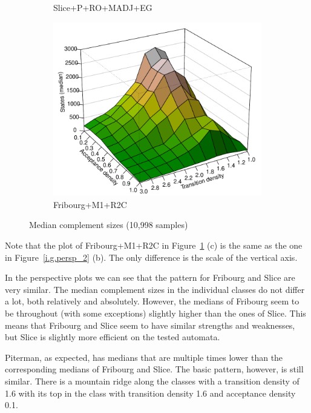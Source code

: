 \begin{figure}[ht]
\begin{subfigure}[t]{\perspwidth\textwidth}
  \caption{Slice+P+RO+MADJ+EG}
  \end{subfigure}
  \hfill
  \begin{subfigure}[t]{\perspwidth\textwidth}
  \centering
  \includegraphics[width=\textwidth]{figures/r/external/goal/s.median.Fribourg+M1+R2C.pdf}
  \caption{Fribourg+M1+R2C}
  \end{subfigure}
  \hfill
\caption{Median complement sizes (10,998 samples)}
\label{e.g.persp}
\end{figure}

Note that the plot of Fribourg+M1+R2C in Figure~\ref{e.g.persp} (c) is the same as the one in Figure~\ref{i.g.persp_2} (b). The only difference is the scale of the vertical axis.

In the perspective plots we can see that the pattern for Fribourg and Slice are very similar. The median complement sizes in the individual classes do not differ a lot, both relatively and absolutely. However, the medians of Fribourg seem to be throughout (with some exceptions) slightly higher than the ones of Slice. This means that Fribourg and Slice seem to have similar strengths and weaknesses, but Slice is slightly more efficient on the tested automata.

Piterman, as expected, has medians that are multiple times lower than the corresponding medians of Fribourg and Slice. The basic pattern, however, is still similar. There is a mountain ridge along the classes with a transition density of 1.6 with its top in the class with transition density 1.6 and acceptance density 0.1.



